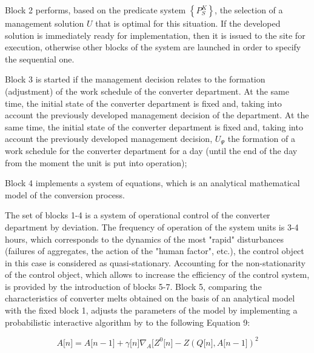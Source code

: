 \begin{multicols}{2}
Block 2 performs, based on the predicate system
$\left\{ P_{S}^{K} \right\}$, the selection of a management
solution $U$ that is optimal for this situation. If the developed
solution is immediately ready for implementation, then it is issued to
the site for execution, otherwise other blocks of the system are
launched in order to specify the sequential one.

Block 3 is started if the management decision relates to the formation
(adjustment) of the work schedule of the converter department. At the
same time, the initial state of the converter department is fixed and,
taking into account the previously developed management decision of the
department. At the same time, the initial state of the converter
department is fixed and, taking into account the previously developed
management decision, $U_{\Psi}$ the formation of a work schedule for
the converter department for a day (until the end of the day from the
moment the unit is put into operation);

Block 4 implements a system of equations, which is an analytical
mathematical model of the conversion process.

The set of blocks 1-4 is a system of operational control of the
converter department by deviation. The frequency of operation of the
system units is 3-4 hours, which corresponds to the dynamics of the most
"rapid" disturbances (failures of aggregates, the action of the "human
factor", etc.), the control object in this case is considered as
quasi-stationary. Accounting for the non-stationarity of the control
object, which allows to increase the efficiency of the control system,
is provided by the introduction of blocks 5-7. Block 5, comparing the
characteristics of converter melts obtained on the basis of an
analytical model with the fixed block 1, adjusts the parameters of the
model by implementing a probabilistic interactive algorithm by to the
following Equation 9:
\end{multicols}

\begin{equation}
A\lbrack n\rbrack = A\lbrack n - 1\rbrack + \gamma\lbrack n\rbrack\nabla_{A}\lbrack Z^{0}\lbrack n\rbrack - Z(Q\lbrack n\rbrack,A\lbrack n - 1\rbrack)^{2}
\end{equation}

